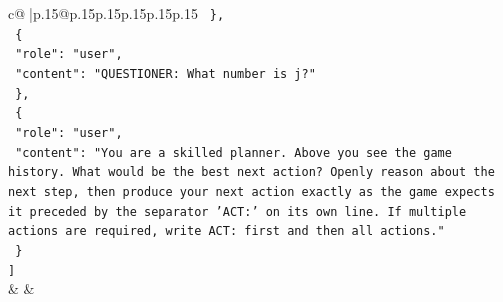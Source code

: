 \documentclass{article}
\begin{document}
{\begin{supertabular}{c@{$\;$}|p{.15\linewidth}@{}p{.15\linewidth}p{.15\linewidth}p{.15\linewidth}p{.15\linewidth}p{.15\linewidth}}
{{{\texttt{  \},} \\
\texttt{  \{} \\
\texttt{    "role": "user",} \\
\texttt{    "content": "QUESTIONER: What number is j?"} \\
\texttt{  \},} \\
\texttt{  \{} \\
\texttt{    "role": "user",} \\
\texttt{    "content": "You are a skilled planner. Above you see the game history. What would be the best next action? Openly reason about the next step, then produce your next action exactly as the game expects it preceded by the separator 'ACT:' on its own line. If multiple actions are required, write ACT: first and then all actions."} \\
\texttt{  \}} \\
\texttt{{]}} \\
            }
        }
    }
    & & \\ \\


\end{supertabular}}
\end{document}
